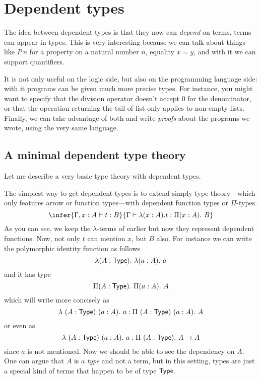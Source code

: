 \chapter{Dependent types}


The idea between dependent types is that they now can \emph{depend} on terms,
\ie terms can appear in types. This is very interesting because we can talk
about things like \(P\ n\) for a property on a natural number \(n\),
equality \(x = y\), and with it we can support quantifiers.

It is not only useful on the logic side, but also on the programming language
side: with it programs can be given much more precise types.
For instance, you might want to specify that the division operator doesn't
accept \(0\) for the denominator, or that the operation returning the tail of
list only applies to non-empty lists.
Finally, we can take advantage of both and write \emph{proofs} about the
programs we wrote, using the very same language.

\section{A minimal dependent type theory}

Let me describe a very basic type theory with dependent types.


The simplest way to get dependent types is to extend simply type theory---which
only features arrow or function types---with dependent function types or
\(\Pi\)-types.
\[
  \infer
    {\Ga, x :A \vdash t : B}
    {\Ga \vdash \lambda (x:A).t : \Pi (x:A).\ B}
\]
As you can see, we keep the \(\lambda\)-terms of earlier but now they represent
dependent functions. Now, not only \(t\) can mention \(x\), but \(B\) also.
For instance we can write the polymorphic identity function as follows
\[
  \lambda (A : \mathsf{Type}).\ \lambda (a : A).\ a
\]
and it has type
\[
  \Pi (A : \mathsf{Type}).\ \Pi (a : A).\ A
\]
which will write more concisely as
\[
  \lambda\ (A : \mathsf{Type})\ (a : A).\ a
  : \Pi\ (A : \mathsf{Type})\ (a : A).\ A
\]
or even as
\[
  \lambda\ (A : \mathsf{Type})\ (a : A).\ a
  : \Pi\ (A : \mathsf{Type}).\ A \to A
\]
since \(a\) is not mentioned.
Now we should be able to see the dependency on \(A\).
One can argue that \(A\) is a \emph{type} and not a term, but in this setting,
types are just a special kind of terms that happen to be of type \(\mathsf{Type}\).

